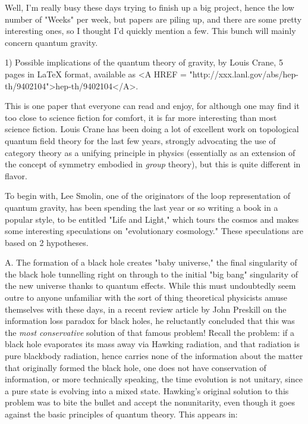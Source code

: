 

Well, I'm really busy these days trying to finish up a big project,
hence the low number of "Weeks" per week, but papers are piling up, and
there are some pretty interesting ones, so I thought I'd quickly mention
a few.  This bunch will mainly concern quantum gravity.  

1) Possible implications of the quantum theory of gravity, by Louis
Crane, 5 pages in LaTeX format, available as <A HREF = "http://xxx.lanl.gov/abs/hep-th/9402104">hep-th/9402104</A>.  

This is one paper that everyone can read and enjoy, for although one may
find it too close to science fiction for comfort, it is far more
interesting than most science fiction.  Louis Crane has been doing a lot
of excellent work on topological quantum field theory for the last few
years, strongly advocating the use of category theory as a unifying
principle in physics (essentially as an extension of the concept of
symmetry embodied in \emph{group} theory), but this is quite different in
flavor.  

To begin with, Lee Smolin, one of the originators of the loop representation
of quantum gravity, has been spending the last year or so writing a book
in a popular style, to be entitled "Life and Light," which tours the
cosmos and makes some interesting speculations on "evolutionary
cosmology."  These speculations are based on 2 hypotheses.

A. The formation of a black hole creates "baby universe," the final
singularity of the black hole tunnelling right on through to the initial
"big bang" singularity of the new universe thanks to quantum effects.
While this must undoubtedly seem outre to anyone unfamiliar with the
sort of thing theoretical physicists amuse themselves with these days,
in a recent review article by John Preskill on the information loss
paradox for black holes, he reluctantly concluded that this was the
\emph{most conservative} solution of that famous problem!  Recall the
problem: if a black hole evaporates its mass away via Hawking radiation,
and that radiation is pure blackbody radiation, hence carries none of
the information about the matter that originally formed the black hole,
one does not have conservation of information, or more technically
speaking, the time evolution is not unitary, since a pure state is
evolving into a mixed state.  Hawking's original solution to this
problem was to bite the bullet and accept the nonunitarity, even though
it goes against the basic principles of quantum theory.  This appears in:

